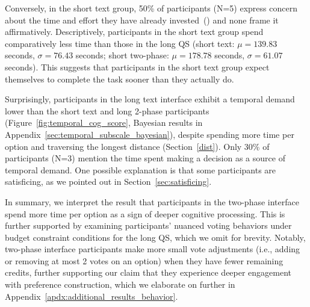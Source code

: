 Conversely, in the short text group, 50\% of participants (N=5) express concern about the time and effort they have already invested~() and none frame it affirmatively. Descriptively, participants in the short text group spend comparatively less time than those in the long QS (short text: $\mu=139.83$ seconds, $\sigma=76.43$ seconds; short two-phase: $\mu=178.78$ seconds, $\sigma=61.07$ seconds). This suggests that participants in the short text group expect themselves to complete the task sooner than they actually do. 


Surprisingly, participants in the long text interface exhibit a temporal demand lower than the short text and long 2-phase participants (Figure~\ref{fig:temporal_cog_score}, Bayesian results in Appendix~\ref{sec:temporal_subscale_bayesian}), despite spending more time per option and traversing the longest distance (Section~\ref{dist}). Only 30\% of participants (N=3) mention the time spent making a decision as a source of temporal demand. One possible explanation is that some participants are satisficing, as we pointed out in Section~\ref{sec:satisficing}.  

In summary, we interpret the result that participants in the two-phase interface spend more time per option as a sign of deeper cognitive processing. This is further supported by examining participants' nuanced voting behaviors under budget constraint conditions for the long QS, which we omit for brevity. Notably, two-phase interface participants make more small vote adjustments (i.e., adding or removing at most 2 votes on an option) when they have fewer remaining credits, further supporting our claim that they experience deeper engagement with preference construction, which we elaborate on further in Appendix~\ref{apdx:additional_results_behavior}.
